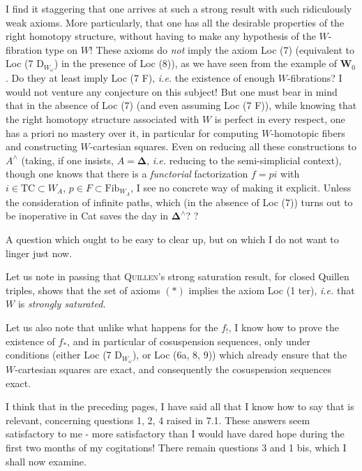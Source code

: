 \documentclass[11pt]{article}
\newcommand{\msp}[1]{\marginpar{\footnotesize [#1]}}
\begin{document}
I find it staggering that one arrives at such a strong result with such ridiculously weak axioms. More particularly, that one has all the desirable properties of the right homotopy structure, without having to make any hypothesis of the $W$-fibration type on $W$! These axioms do \textit{not} imply the axiom Loc (7) (equivalent to Loc (7 $\mathrm{D}_{W_\omega}$) in the presence of Loc (8)), as we have seen from the example of $\mathbf{W}_0$. Do they at least imply Loc (7 F), \textit{i.e.} the existence of enough $W$-fibrations? I would not venture any conjecture on this subject! But one must bear in mind that in the absence of Loc (7) (and even
\msp{page 106}
assuming Loc (7 F)), while knowing that the right homotopy structure associated with $W$ is perfect in every respect, one has a priori no mastery over it, in particular for computing $W$-homotopic fibers and constructing $W$-cartesian squares. Even on reducing all these constructions to $A^\wedge$ (taking, if one insists, $A = \boldsymbol{\Delta}$, \textit{i.e.} reducing to the semi-simplicial context), though one knows that there is a \textit{functorial} factorization $f = pi$ with $i \in \mathrm{TC} \subset W_A$, $p \in F \subset \mathrm{Fib}_{W_A}$, I see no concrete way of making it explicit. Unless the consideration of infinite paths, which (in the absence of Loc (7)) turns out to be inoperative in Cat saves the day in $\boldsymbol{\Delta}^\wedge$? ?

\msp{page 107}
A question which ought to be easy to clear up, but on which I do not want to linger just now.

Let us note in passing that \textsc{Quillen}'s strong saturation result, for closed Quillen triples, shows that the set of axioms $(*)$ implies the axiom Loc (1 ter), \textit{i.e.} that $W$ is \textit{strongly saturated.}

Let us also note that unlike what happens for the $f_!$, I know how to prove the existence of $f_*$, and in particular of cosuspension sequences, only under conditions (either Loc (7 $\mathrm{D}_{W_\omega}$), or Loc (6a, 8, 9)) which already ensure that the $W$-cartesian squares are exact, and consequently the cosuspension sequences exact.

I think that in the preceding pages, I have said all that I know how to say that is relevant, concerning questions 1, 2, 4 raised in 7.1. These answers se\msp{page 108}em satisfactory to me - more satisfactory than I would have dared hope during the first two months of my cogitations! There remain questions 3 and 1 bis, which I shall now examine.
\end{document}
